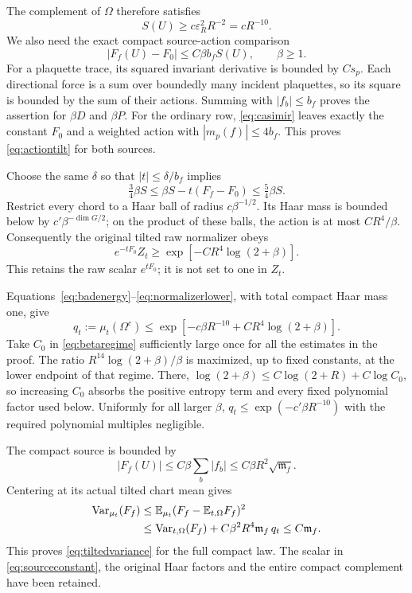 \documentclass[11pt,letterpaper]{article}
\numberwithin{equation}{section}
\theoremstyle{definition}\newtheorem{definition}[theorem]{Definition}
\theoremstyle{remark}\newtheorem{remark}[theorem]{Remark}
\newcommand{\E}{\mathbb E}\newcommand{\Var}{\operatorname{Var}}
\newcommand{\mf}{\mathfrak m_f}\newcommand{\eps}{\varepsilon}
\begin{document}
The complement of $\Omega$ therefore satisfies
\begin{equation}
 S(U)\ge c\eps_R^2R^{-2}=cR^{-10}.
 \label{eq:badenergy}
\end{equation}
We also need the exact compact source-action comparison
\begin{equation}
 |F_f(U)-F_0|\le C\beta b_f S(U),\qquad \beta\ge1.
 \label{eq:actiontilt}
\end{equation}
For a plaquette trace, its squared invariant derivative is bounded by $Cs_p$. Each directional force is a sum over boundedly many incident plaquettes, so its square is bounded by the sum of their actions. Summing with $|f_b|\le b_f$ proves the assertion for $\beta D$ and $\beta P$. For the ordinary row, \eqref{eq:casimir} leaves exactly the constant $F_0$ and a weighted action with $|m_p(f)|\le4b_f$. This proves \eqref{eq:actiontilt} for both sources.

Choose the same $\delta$ so that $|t|\le\delta/b_f$ implies
\begin{equation}
 \tfrac34\beta S\le \beta S-t(F_f-F_0)\le\tfrac54\beta S.
 \label{eq:tiltedaction}
\end{equation}
Restrict every chord to a Haar ball of radius $c\beta^{-1/2}$. Its Haar mass is bounded below by $c'\beta^{-\dim G/2}$; on the product of these balls, the action is at most $CR^4/\beta$. Consequently the original tilted raw normalizer obeys
\begin{equation}
 e^{-tF_0}Z_t\ge\exp[-CR^4\log(2+\beta)].
 \label{eq:normalizerlower}
\end{equation}
This retains the raw scalar $e^{tF_0}$; it is not set to one in $Z_t$.

Equations~\eqref{eq:badenergy}--\eqref{eq:normalizerlower}, with total compact Haar mass one, give
\begin{equation}
 q_t:=\mu_t(\Omega^c)
 \le\exp[-c\beta R^{-10}+CR^4\log(2+\beta)].
 \label{eq:badtail}
\end{equation}
Take $C_0$ in \eqref{eq:betaregime} sufficiently large once for all the estimates in the proof. The ratio $R^{14}\log(2+\beta)/\beta$ is maximized, up to fixed constants, at the lower endpoint of that regime. There, $\log(2+\beta)\le C\log(2+R)+C\log C_0$, so increasing $C_0$ absorbs the positive entropy term and every fixed polynomial factor used below. Uniformly for all larger $\beta$,
$q_t\le\exp(-c'\beta R^{-10})$ with the required polynomial multiples negligible.

The compact source is bounded by
\[
 |F_f(U)|\le C\beta\sum_b|f_b|
 \le C\beta R^2\sqrt{\mf}.
\]
Centering at its actual tilted chart mean gives
\begin{align}
 \Var_{\mu_t}(F_f)
 &\le\E_{\mu_t}(F_f-\E_{t,\Omega}F_f)^2\notag\\
 &\le\Var_{t,\Omega}(F_f)+C\beta^2R^4\mf\,q_t
 \le C\mf.
 \label{eq:fullvariance}
\end{align}
This proves \eqref{eq:tiltedvariance} for the full compact law. The scalar in \eqref{eq:sourceconstant}, the original Haar factors and the entire compact complement have been retained.
\end{document}
